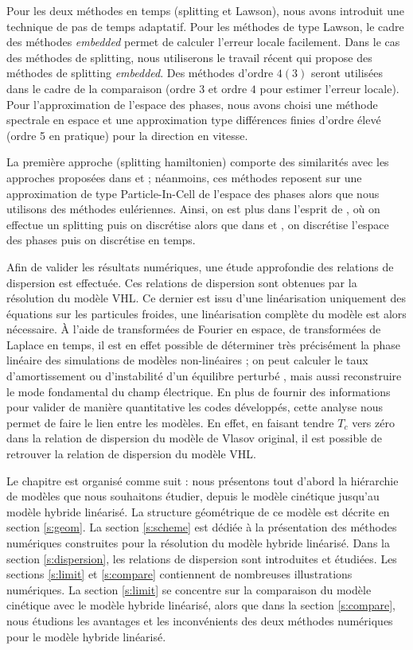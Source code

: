 Pour les deux méthodes en temps (splitting et Lawson), nous avons introduit une technique de pas de temps adaptatif. Pour les méthodes de type Lawson, le cadre des méthodes \emph{embedded} \cite{Dormand:1980}\cite{Dormand:1978}  \cite{Balac:2013}\cite{Balac:2014} permet de calculer l'erreur locale facilement. Dans le cas des méthodes de splitting, nous utiliserons le travail récent \cite{Blanes:2019} qui propose des méthodes de splitting \emph{embedded}. Des méthodes d'ordre $4(3)$ seront utilisées dans le cadre de la comparaison (ordre $3$ et ordre $4$ pour estimer l'erreur locale). Pour l'approximation de l'espace des phases, nous avons choisi une méthode spectrale en espace et une approximation type différences finies d'ordre élevé (ordre 5 en pratique) pour la direction en vitesse. 

La première approche (splitting hamiltonien) comporte des similarités avec les approches proposées dans \cite{Kraus:2017} et \cite{Holderied:2019} ; néanmoins, ces méthodes reposent sur une approximation de type Particle-In-Cell de l'espace des phases alors que nous utilisons des méthodes eulériennes. Ainsi, on est plus dans l'esprit de \cite{Crouseilles:2015}, \cite{Li:2020} où on effectue un splitting puis on discrétise alors que dans  \cite{Kraus:2017} et \cite{Holderied:2019}, on discrétise l'espace des phases puis on discrétise en temps.  

Afin de valider les résultats numériques, une étude approfondie des relations de dispersion est effectuée. Ces relations de dispersion sont obtenues par la résolution du modèle VHL. Ce dernier est issu d'une linéarisation uniquement des équations sur les particules froides, une linéarisation complète du modèle est alors nécessaire. À l'aide de transformées de Fourier en espace, de transformées de Laplace en temps, il est en effet possible de déterminer très précisément la phase linéaire des simulations de modèles non-linéaires ; on peut calculer le taux d'amortissement ou d'instabilité d'un équilibre perturbé \cite{Sonnendrucker:2015} \cite{Fried:1961}, mais aussi reconstruire le mode fondamental du champ électrique. En plus de fournir des informations pour valider de manière quantitative les codes développés, cette analyse nous permet de faire le lien entre les modèles. En effet, en faisant tendre $T_c$ vers zéro dans la relation de dispersion du modèle de Vlasov original, il est possible de retrouver la relation de dispersion du modèle VHL. 

Le chapitre est organisé comme suit : nous présentons tout d'abord la hiérarchie de modèles que nous souhaitons étudier, depuis le modèle cinétique jusqu'au modèle hybride linéarisé. La structure géométrique de ce modèle est décrite en section \ref{s:geom}. La section \ref{s:scheme} est dédiée à la présentation des méthodes numériques construites pour la résolution du modèle hybride linéarisé. Dans la section \ref{s:dispersion}, les relations de dispersion sont introduites et étudiées. Les sections \ref{s:limit} et \ref{s:compare} contiennent de nombreuses illustrations numériques. La section \ref{s:limit} se concentre sur la comparaison du modèle cinétique avec le modèle hybride linéarisé, alors que dans la section \ref{s:compare}, nous étudions les avantages et les inconvénients des deux méthodes numériques pour le modèle hybride linéarisé.
